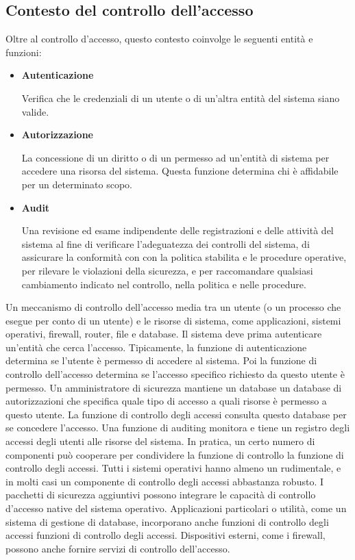 \subsection{Contesto del controllo dell'accesso}
Oltre al controllo d'accesso, questo contesto coinvolge le seguenti entità e funzioni:
\begin{itemize}
    \item \textbf{Autenticazione}
    
    Verifica che le credenziali di un utente o di un'altra entità del sistema siano valide.
    
    \item \textbf{Autorizzazione}
    
    La concessione di un diritto o di un permesso ad un'entità di sistema per accedere una risorsa del sistema. Questa funzione determina chi è affidabile per un determinato scopo.
    
    \item \textbf{Audit}
    
    Una revisione ed esame indipendente delle registrazioni e delle attività del sistema al fine di verificare l'adeguatezza dei controlli del sistema, di assicurare la conformità con con la politica stabilita e le procedure operative, per rilevare le violazioni della sicurezza, e per raccomandare qualsiasi cambiamento indicato nel controllo, nella politica e nelle procedure.

\end{itemize}
Un meccanismo di controllo dell'accesso media tra un utente (o un processo che esegue per conto di un utente) e le risorse di sistema, come applicazioni, sistemi operativi, firewall, router, file e database. Il sistema deve prima autenticare un'entità che cerca l'accesso. Tipicamente, la funzione di autenticazione determina se l'utente è permesso di accedere al sistema. Poi la funzione di controllo dell'accesso determina se l'accesso specifico richiesto da questo utente è permesso. Un amministratore di sicurezza mantiene un database un database di autorizzazioni che specifica quale tipo di accesso a quali risorse è permesso a questo utente. La funzione di controllo degli accessi consulta questo database per se concedere l'accesso. Una funzione di auditing monitora e tiene un registro degli accessi degli utenti alle risorse del sistema.
\singlespacing
In pratica, un certo numero di componenti può cooperare per condividere la funzione di controllo la funzione di controllo degli accessi. Tutti i sistemi operativi hanno almeno un rudimentale, e in molti casi un componente di controllo degli accessi abbastanza robusto. I pacchetti di sicurezza aggiuntivi possono integrare le capacità di controllo d'accesso native del sistema operativo. Applicazioni particolari o utilità, come un sistema di gestione di database, incorporano anche funzioni di controllo degli accessi funzioni di controllo degli accessi. Dispositivi esterni, come i firewall, possono anche fornire servizi di controllo dell'accesso.
\newpage
